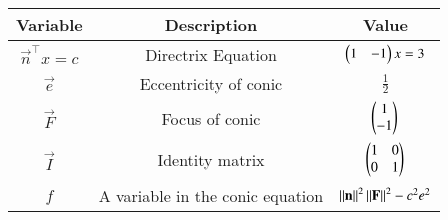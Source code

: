 \begin{tabular}[12pt]{ |c| c| c|}
    \hline
    \textbf{Variable} & \textbf{Description} & \textbf{Value}\\
	\hline
	$\vec{n}^\top x= c$ & Directrix Equation & $\begin{pmatrix}1 & -1\end{pmatrix} x = 3$\\
	\hline
	$\vec{e}$ & Eccentricity of conic & $\frac{1}{2}$\\
	\hline
	$\vec{F}$ & Focus of conic &  $\begin{pmatrix}1 \\ -1\end{pmatrix}$ \\
	\hline
	$\vec{I}$ & Identity matrix &  $\begin{pmatrix}1 & 0 \\ 0 & 1\end{pmatrix}$\\
	\hline
	$f$ & A variable in the conic equation& $\left\lVert\mathbf{n}\right\rVert^2\left\lVert\mathbf{F}\right\rVert^2-c^2e^2$ \\
	\hline
\end{tabular}
